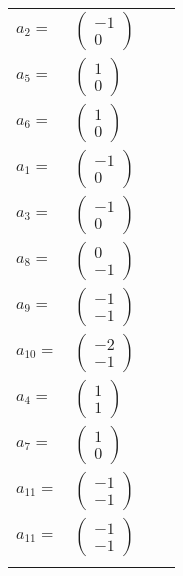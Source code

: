 \documentclass[1p]{elsarticle_modified}
\theoremstyle{definition}
\begin{document}
\begin{tabular}{m{7pt} m{180pt} m{7pt} m{180pt} }
\flushright $a_{2}=$&$\begin{pmatrix}-1\\0\end{pmatrix}$ \\
\flushright $a_{5}=$&$\begin{pmatrix}1\\0\end{pmatrix}$ \\
\flushright $a_{6}=$&$\begin{pmatrix}1\\0\end{pmatrix}$ \\
\flushright $a_{1}=$&$\begin{pmatrix}-1\\0\end{pmatrix}$ \\
\flushright $a_{3}=$&$\begin{pmatrix}-1\\0\end{pmatrix}$ \\
\flushright $a_{8}=$&$\begin{pmatrix}0\\-1\end{pmatrix}$ \\
\flushright $a_{9}=$&$\begin{pmatrix}-1\\-1\end{pmatrix}$ \\
\flushright $a_{10}=$&$\begin{pmatrix}-2\\-1\end{pmatrix}$ \\
\flushright $a_{4}=$&$\begin{pmatrix}1\\1\end{pmatrix}$ \\
\flushright $a_{7}=$&$\begin{pmatrix}1\\0\end{pmatrix}$ \\
\flushright $a_{11}=$&$\begin{pmatrix}-1\\-1\end{pmatrix}$\\ \flushright $a_{11}=$&$\begin{pmatrix}-1\\-1\end{pmatrix}$\\&\end{tabular}
\end{document}

